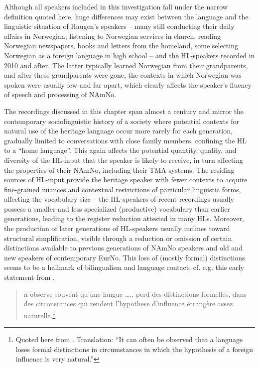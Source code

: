 \documentclass[output=paper]{langscibook}
\begin{document}
Although all speakers included in this investigation fall under the narrow definition quoted here, huge differences may exist between the language and the linguistic situation of Haugen’s speakers – many still conducting their daily affairs in Norwegian, listening to Norwegian services in church, reading Norwegian newspapers, books and letters from the homeland, some selecting Norwegian as a foreign language in high school – and the HL-speakers recorded in 2010 and after. The latter typically learned Norwegian from their grandparents, and after these grandparents were gone, the contexts in which Norwegian was spoken were usually few and far apart, which clearly affects the speaker’s fluency of speech and processing of NAmNo. 

The recordings discussed in this chapter span almost a century and mirror the contemporary sociolinguistic history of a society where potential contexts for natural use of the heritage language occur more rarely for each generation, gradually limited to conversations with close family members, confining the HL to a “home language”. This again affects the potential quantity, quality, and diversity of the HL-input that the speaker is likely to receive, in turn affecting the properties of their NAmNo, including their TMA-systems. The residing sources of HL-input provide the heritage speaker with fewer contexts to acquire fine-grained nuances and contextual restrictions of particular linguistic forms, affecting the vocabulary size – the HL-speakers of recent recordings usually possess a smaller and less specialized (productive) vocabulary than earlier generations, leading to the register reduction attested in many HLs. Moreover, the production of later generations of HL-speakers usually inclines toward structural simplification, visible through a reduction or omission of certain distinctions available to previous generations of NAmNo speakers and old and new speakers of contemporary EurNo. This loss of (mostly formal) distinctions seems to be a hallmark of bilingualism and language contact, cf. e.g. this early statement from \citet[39]{Vogt1948}. 

\begin{quote}
 \relax
 [O]n observe souvent qu’une langue ….. perd des distinctions formelles, dans des circonstances qui rendent l’hypothese d’influence étrangère assez naturelle.\footnote{Quoted here from \citet{Trudgill2011}. Translation: “It can often be observed that a language loses formal distinctions in circumstances in which the hypothesis of a foreign influence is very natural.”}
\end{quote}
\end{document}
